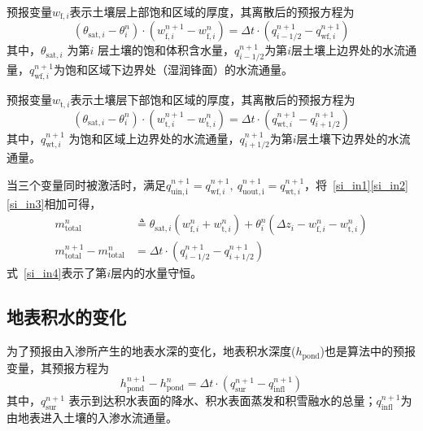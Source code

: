 预报变量$w_{\mathrm{f},i}$表示土壤层上部饱和区域的厚度，其离散后的预报方程为
\begin{equation}\label{si_in2}
  \left(\theta_{\mathrm{sat},i}-\theta_{i}^{n}\right) \cdot\left(w_{\mathrm{f},i}^{n+1}-w_{\mathrm{f},i}^{n}\right)=\Delta t \cdot\left(q_{i-1/2}^{n+1}-q_{\mathrm{w f},i}^{n+1}\right)
\end{equation}
其中，$\theta_{\mathrm{sat},i}$ 为第$ i$ 层土壤的饱和体积含水量，$ q_{{i-1/2}}^{n+1}$为第$i$层土壤上边界处的水流通量，$q_{\mathrm{wf},i}^{n+1}$为饱和区域下边界处（湿润锋面）的水流通量。


预报变量$w_{\mathrm{t},i}$表示土壤层下部饱和区域的厚度，其离散后的预报方程为
\begin{equation}\label{si_in3}
  \left(\theta_{\mathrm{sat},i}-\theta_{i}^{n}\right) \cdot\left(w_{\mathrm{t},i}^{n+1}-w_{\mathrm{t},i}^{n}\right)=\Delta t \cdot\left(q_{\mathrm{w t},i}^{n+1}-q_{i+1 / 2}^{n+1}\right)
\end{equation}
其中，$q_{\mathrm{wt},i}^{n+1}$  为饱和区域上边界处的水流通量，$q_{i+1/2}^{n+1}$为第$i$层土壤下边界处的水流通量。

当三个变量同时被激活时，满足$q_{\mathrm{ {uin,i }}}^{n+1}=q_{\mathrm{w f},i}^{n+1},~ q_{\mathrm{ {uout,i }}}^{n+1}=q_{\mathrm{wt},i}^{n+1}$，将~\eqref{si_in1}\eqref{si_in2}\eqref{si_in3}相加可得，
\begin{equation}\label{si_in4}
  \begin{aligned}
    m_{\mathrm{total}}^n & \triangleq \theta_{\mathrm{sat},i}\left(w_{\mathrm{f},i}^n+w_{\mathrm{t},i}^{n}\right)+\theta_{i}^{n}\left(\Delta z_i - w_{\mathrm{f},i}^{n} - w_{\mathrm{t},i}^{n}\right) \\
    m_{\mathrm{total}}^{n+1} - m_{\mathrm{total}}^n & =\Delta t \cdot\left(q_{i-1/2}^{n+1}-q_{i+1 / 2}^{n+1}\right)
  \end{aligned}
\end{equation}
式~\eqref{si_in4}表示了第$i$层内的水量守恒。

\subsection{地表积水的变化}
为了预报由入渗所产生的地表水深的变化，地表积水深度($h_{\mathrm{pond}}$)也是算法中的预报变量，其预报方程为
\begin{equation}\label{hpond}
  h_{\mathrm{ {pond }}}^{n+1}-h_{\mathrm{ {pond }}}^{n}=\Delta t \cdot\left(q_{\mathrm{ {sur }}}^{n+1}-q_{\mathrm{ {infl }}}^{n+1}\right)
\end{equation}
其中，$q_{\mathrm{sur}}^{n+1} $ 表示到达积水表面的降水、积水表面蒸发和积雪融水的总量；$q_{\mathrm{infl}}^{n+1}$为由地表进入土壤的入渗水流通量。


